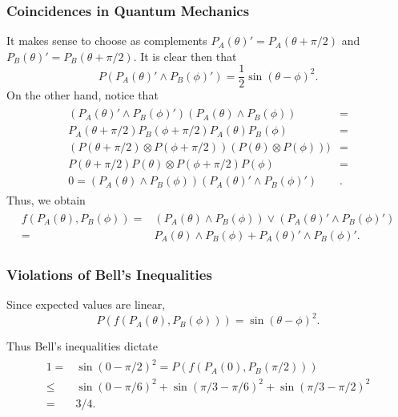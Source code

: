 \documentclass{beamer}
\begin{document}
\begin{frame}

	\frametitle{Coincidences in Quantum Mechanics}
	
	It makes sense to choose as complements $P_A(\theta)'=P_A(\theta+\pi/2)$ and $P_B(\theta)'=P_B(\theta+\pi/2)$. It is clear then that 
	\begin{equation}
		P(P_A(\theta)'\wedge P_B(\phi)')=\frac{1}{2}\sin(\theta-\phi)^2.
	\end{equation}
	On the other hand, notice that
	\begin{align}
	\begin{split}
		(P_A(\theta)'\wedge P_B(\phi)')(P_A(\theta)\wedge P_B(\phi))&=\\
		P_A(\theta+\pi/2)P_B(\phi+\pi/2)P_A(\theta)P_B(\phi)&=\\
		(P(\theta+\pi/2)\otimes P(\phi+\pi/2))(P(\theta)\otimes P(\phi)))&=\\
		P(\theta+\pi/2)P(\theta)\otimes P(\phi+\pi/2)P(\phi)&=\\
		0=(P_A(\theta)\wedge P_B(\phi))(P_A(\theta)'\wedge P_B(\phi)')&.
	\end{split}
	\end{align}	 
	Thus, we obtain
	\begin{align}
	\begin{split}
	f(P_A(\theta),P_B(\phi))=&(P_A(\theta)\wedge P_B(\phi))\vee(P_A(\theta)'\wedge P_B(\phi)')\\
	=&P_A(\theta)\wedge P_B(\phi)+P_A(\theta)'\wedge P_B(\phi)'.
	\end{split}
	\end{align}

\end{frame}

\begin{frame}

	\frametitle{Violations of Bell's Inequalities}

	Since expected values are linear, 
	\begin{equation}
	P(f(P_A(\theta),P_B(\phi)))=\sin(\theta-\phi)^2.
	\end{equation}
	
	Thus Bell's inequalities dictate	
	\begin{align}
	\begin{split}
	1=&\sin(0-\pi/2)^2=P(f(P_A(0),P_B(\pi/2)))\\
	\leq&\sin(0-\pi/6)^2+\sin(\pi/3-\pi/6)^2+\sin(\pi/3-\pi/2)^2\\
	=&3/4.
	\end{split}
	\end{align}

\end{frame}
\end{document}
